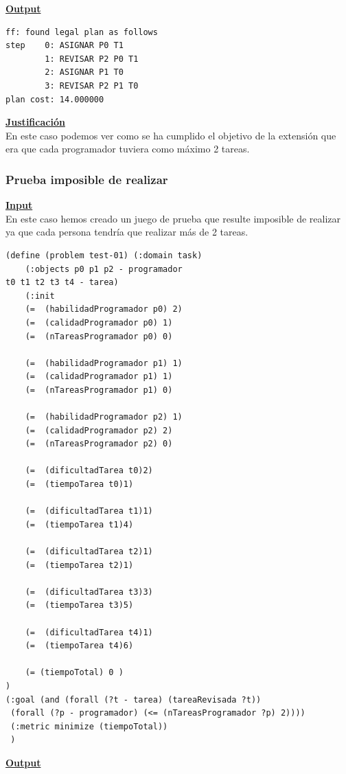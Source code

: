 \documentclass[11pt]{article}
\begin{document}
 \noindent \underline{\textbf{Output}}
\medskip
\begin{verbatim}
ff: found legal plan as follows
step    0: ASIGNAR P0 T1
        1: REVISAR P2 P0 T1
        2: ASIGNAR P1 T0
        3: REVISAR P2 P1 T0
plan cost: 14.000000

\end{verbatim}
\medskip

\noindent \underline{\textbf{Justificación}}\\

En este caso podemos ver como se ha cumplido el objetivo de la extensión que era que cada programador tuviera como máximo 2 tareas. 

\subsubsection{Prueba imposible de realizar}
\noindent \underline{\textbf{Input}} 
\\

En este caso hemos creado un juego de prueba que resulte imposible de realizar ya que cada persona tendría que realizar más de 2 tareas. 
\medskip
\begin{verbatim}
(define (problem test-01) (:domain task) 
	(:objects p0 p1 p2 - programador
t0 t1 t2 t3 t4 - tarea)
	(:init
	(=  (habilidadProgramador p0) 2)
	(=  (calidadProgramador p0) 1)
	(=  (nTareasProgramador p0) 0)

	(=  (habilidadProgramador p1) 1)
	(=  (calidadProgramador p1) 1)
	(=  (nTareasProgramador p1) 0)

	(=  (habilidadProgramador p2) 1)
	(=  (calidadProgramador p2) 2)
	(=  (nTareasProgramador p2) 0)

	(=  (dificultadTarea t0)2)
	(=  (tiempoTarea t0)1)

	(=  (dificultadTarea t1)1)
	(=  (tiempoTarea t1)4)

	(=  (dificultadTarea t2)1)
	(=  (tiempoTarea t2)1)

	(=  (dificultadTarea t3)3)
	(=  (tiempoTarea t3)5)

	(=  (dificultadTarea t4)1)
	(=  (tiempoTarea t4)6)

	(= (tiempoTotal) 0 )
)
(:goal (and (forall (?t - tarea) (tareaRevisada ?t))
 (forall (?p - programador) (<= (nTareasProgramador ?p) 2))))
 (:metric minimize (tiempoTotal))
 )

\end{verbatim}

\noindent \underline{\textbf{Output}}
\\
\end{document}
